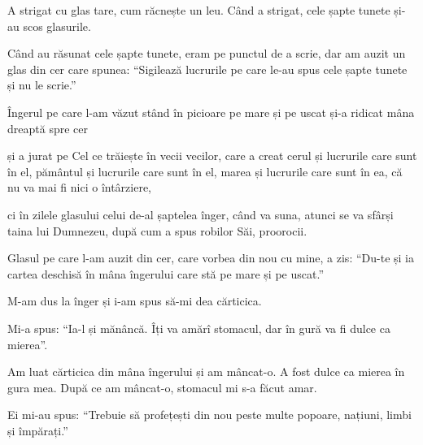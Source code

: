 {A strigat cu glas tare, cum răcnește un leu. Când a strigat, cele șapte tunete și-au scos glasurile.

Când au răsunat cele șapte tunete, eram pe punctul de a scrie, dar am auzit un glas din cer care spunea: “Sigilează lucrurile pe care le-au spus cele șapte tunete și nu le scrie.”


\par }{\PP {}Îngerul pe care l-am văzut stând în picioare pe mare și pe uscat și-a ridicat mâna dreaptă spre cer

și a jurat pe Cel ce trăiește în vecii vecilor, care a creat cerul și lucrurile care sunt în el, pământul și lucrurile care sunt în el, marea și lucrurile care sunt în ea, că nu va mai fi nici o întârziere,

ci în zilele glasului celui de-al șaptelea înger, când va suna, atunci se va sfârși taina lui Dumnezeu, după cum a spus robilor Săi, proorocii.


\par }{\PP {}Glasul pe care l-am auzit din cer, care vorbea din nou cu mine, a zis: “Du-te și ia cartea deschisă în mâna îngerului care stă pe mare și pe uscat.”


\par }{\PP {}M-am dus la înger și i-am spus să-mi dea cărticica.

\par }{\PP Mi-a spus: “Ia-l și mănâncă. Îți va amărî stomacul, dar în gură va fi dulce ca mierea”.


\par }{\PP {}Am luat cărticica din mâna îngerului și am mâncat-o. A fost dulce ca mierea în gura mea. După ce am mâncat-o, stomacul mi s-a făcut amar.

Ei mi-au spus: “Trebuie să profețești din nou peste multe popoare, națiuni, limbi și împărați.”



\par }

